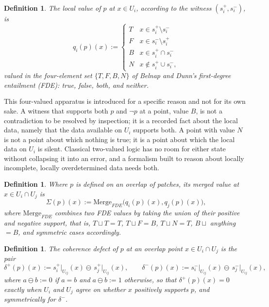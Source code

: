 \documentclass[11pt]{book}
\newtheorem{definition}[theorem]{Definition}
\begin{document}
\begin{definition}
The \emph{local value} of $p$ at $x \in U_i$, according to the witness $(s_i^+, s_i^-)$, is
\[
q_i(p)(x) :=
\begin{cases}
T & x \in s_i^+ \setminus s_i^- \\
F & x \in s_i^- \setminus s_i^+ \\
B & x \in s_i^+ \cap s_i^- \\
N & x \notin s_i^+ \cup s_i^-,
\end{cases}
\]
valued in the four-element set $\{T, F, B, N\}$ of Belnap and Dunn's first-degree entailment (FDE): true, false, both, and neither.
\end{definition}

This four-valued apparatus is introduced for a specific reason and not for its own sake. A witness that supports both $p$ and $\neg p$ at a point, value $B$, is not a contradiction to be resolved by inspection; it is a recorded fact about the local data, namely that the data available on $U_i$ supports both. A point with value $N$ is not a point about which nothing is true; it is a point about which the local data on $U_i$ is silent. Classical two-valued logic has no room for either state without collapsing it into an error, and a formalism built to reason about locally incomplete, locally overdetermined data needs both.

\begin{definition}
Where $p$ is defined on an overlap of patches, its \emph{merged value} at $x \in U_i \cap U_j$ is
\[
\Sigma(p)(x) := \mathrm{Merge}_{FDE}\big(q_i(p)(x), q_j(p)(x)\big),
\]
where $\mathrm{Merge}_{FDE}$ combines two FDE values by taking the union of their positive and negative support, that is, $T \sqcup T = T$, $T \sqcup F = B$, $T \sqcup N = T$, $B \sqcup$ anything $= B$, and symmetric cases accordingly.
\end{definition}

\begin{definition}
The \emph{coherence defect} of $p$ at an overlap point $x \in U_i \cap U_j$ is the pair
\[
\delta^+(p)(x) := s_i^+\big|_{U_{ij}}(x) \ominus \, s_j^+\big|_{U_{ij}}(x), \qquad \delta^-(p)(x) := s_i^-\big|_{U_{ij}}(x) \ominus \, s_j^-\big|_{U_{ij}}(x),
\]
where $a \ominus b := 0$ if $a = b$ and $a \ominus b := 1$ otherwise, so that $\delta^+(p)(x) = 0$ exactly when $U_i$ and $U_j$ agree on whether $x$ positively supports $p$, and symmetrically for $\delta^-$.
\end{definition}
\end{document}
